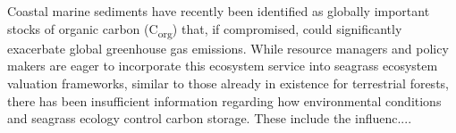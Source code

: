 	\indent Coastal marine sediments have recently been identified as globally important stocks of organic carbon (C\textsubscript{org}) that, if compromised, could significantly exacerbate global greenhouse gas emissions. While resource managers and policy makers are eager to incorporate this ecosystem service into seagrass ecosystem valuation frameworks, similar to those already in existence for terrestrial forests, there has been insufficient information regarding how environmental conditions and seagrass ecology control carbon storage. These include the influenc....
